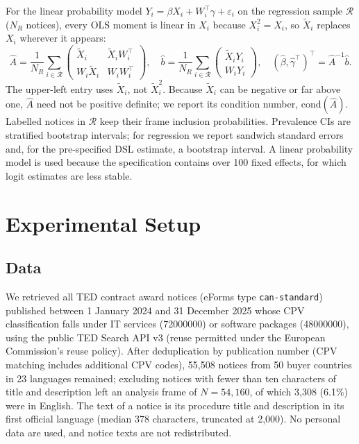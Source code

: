 \documentclass[runningheads]{llncs}
\begin{document}
For the linear probability model $Y_i=\beta X_i+W_i^\top\gamma+\varepsilon_i$ on the regression sample $\mathcal{R}$ ($N_R$ notices), every OLS moment is linear in $X_i$ because $X_i^2=X_i$, so $\tilde{X}_i$ replaces $X_i$ wherever it appears:
\begin{equation}
\hat{A}=\frac{1}{N_R}\sum_{i\in\mathcal{R}}\begin{pmatrix}\tilde{X}_i & \tilde{X}_iW_i^\top\\ W_i\tilde{X}_i & W_iW_i^\top\end{pmatrix},\quad
\hat{b}=\frac{1}{N_R}\sum_{i\in\mathcal{R}}\begin{pmatrix}\tilde{X}_iY_i\\ W_iY_i\end{pmatrix},\quad
(\hat\beta,\hat\gamma^\top)^\top=\hat{A}^{-1}\hat{b}.
\label{eq:moments}
\end{equation}
The upper-left entry uses $\tilde{X}_i$, not $\tilde{X}_i^2$. Because $\tilde{X}_i$ can be negative or far above one, $\hat{A}$ need not be positive definite; we report its condition number, $\mathrm{cond}(\hat{A})$. Labelled notices in $\mathcal{R}$ keep their frame inclusion probabilities. Prevalence CIs are stratified bootstrap intervals; for regression we report sandwich standard errors and, for the pre-specified DSL estimate, a bootstrap interval. A linear probability model is used because the specification contains over 100 fixed effects, for which logit estimates are less stable.

\section{Experimental Setup}
\subsection{Data}
\label{sec:data}
We retrieved all TED contract award notices (eForms type \texttt{can-standard}) published between 1 January 2024 and 31 December 2025 whose CPV classification falls under IT services (72000000) or software packages (48000000), using the public TED Search API v3 (reuse permitted under the European Commission's reuse policy). After deduplication by publication number (CPV matching includes additional CPV codes), 55,508 notices from 50 buyer countries in 23 languages remained; excluding notices with fewer than ten characters of title and description left an analysis frame of $N=54{,}160$, of which 3,308 (6.1\%) were in English. The text of a notice is its procedure title and description in its first official language (median 378 characters, truncated at 2,000). No personal data are used, and notice texts are not redistributed.
\end{document}
